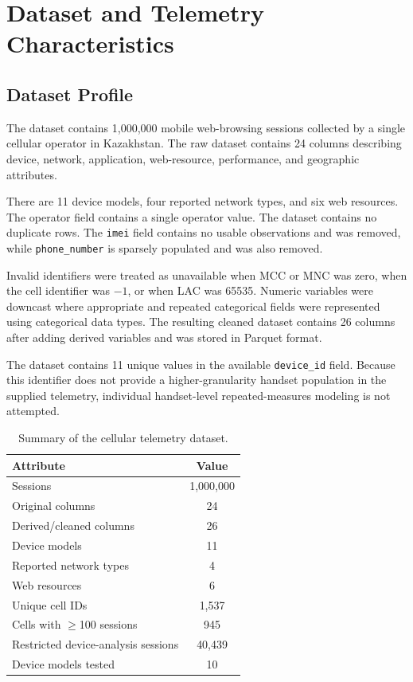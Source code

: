\documentclass[conference]{IEEEtran}
\begin{document}
\section{Dataset and Telemetry Characteristics}

\subsection{Dataset Profile}

The dataset contains 1,000,000 mobile web-browsing sessions collected by a single cellular operator in Kazakhstan. The raw dataset contains 24 columns describing device, network, application, web-resource, performance, and geographic attributes.

There are 11 device models, four reported network types, and six web resources. The operator field contains a single operator value. The dataset contains no duplicate rows. The \texttt{imei} field contains no usable observations and was removed, while \texttt{phone\_number} is sparsely populated and was also removed.

Invalid identifiers were treated as unavailable when MCC or MNC was zero, when the cell identifier was $-1$, or when LAC was 65535. Numeric variables were downcast where appropriate and repeated categorical fields were represented using categorical data types. The resulting cleaned dataset contains 26 columns after adding derived variables and was stored in Parquet format.

The dataset contains 11 unique values in the available \texttt{device\_id} field. Because this identifier does not provide a higher-granularity handset population in the supplied telemetry, individual handset-level repeated-measures modeling is not attempted.

\begin{table}[t]
\caption{Summary of the cellular telemetry dataset.}
\label{tab:dataset}
\centering
\small
\begin{tabular}{lc}
\toprule
\textbf{Attribute} & \textbf{Value}\\
\midrule
Sessions & 1,000,000\\
Original columns & 24\\
Derived/cleaned columns & 26\\
Device models & 11\\
Reported network types & 4\\
Web resources & 6\\
Unique cell IDs & 1,537\\
Cells with $\geq$100 sessions & 945\\
Restricted device-analysis sessions & 40,439\\
Device models tested & 10\\
\bottomrule
\end{tabular}
\end{table}
\end{document}
